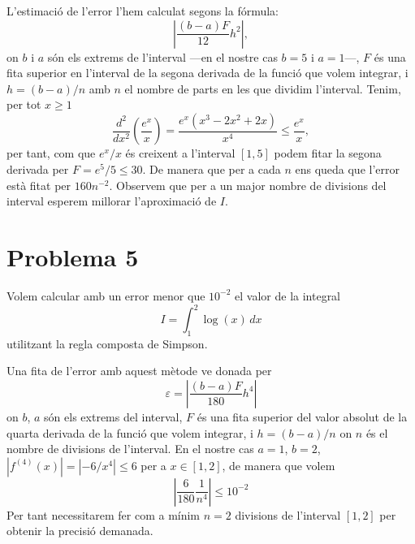 \documentclass[12pt]{article}
\numberwithin{table}{section}
\numberwithin{figure}{section}
\numberwithin{equation}{section}
\newcommand{\abs}[1]{\left\lvert #1 \right\rvert}
\begin{document}
L'estimació de l'error l'hem calculat segons la fórmula:
\begin{equation*}
	\abs{\dfrac{(b-a)F}{12}h^2},
\end{equation*}
on $b$ i $a$ són els extrems de l'interval ---en el nostre cas $b=5$ i $a=1$---, $F$ és una fita superior en l'interval de la segona derivada de la funció que volem integrar, i $h=(b-a)/n$ amb \( n \) el nombre de parts en les que dividim l'interval. Tenim, per tot \( x \geqslant 1 \) 
\begin{equation*}
	\frac{d^2}{dx^2}\left(\frac{e^x}{x}\right) = \dfrac{e^x(x^3-2x^2+2x)}{x^4} \leqslant \dfrac{e^x}{x},
\end{equation*}
per tant, com que \( e^{x}/x \) és creixent a l'interval \( [1,5] \) podem fitar la segona derivada per $F=e^5/5 \leqslant 30$. De manera que per a cada $n$ ens queda que l'error està fitat per \( 160  n^{-2} \). Observem que per a un major nombre de divisions del interval esperem millorar l'aproximació de $I$.

\newpage

\section{Problema 5}
Volem calcular amb un error menor que $10^{-2}$ el valor de la integral
\begin{equation*}
	I = \int_{1}^{2}\log(x) \, dx
\end{equation*}
utilitzant la regla composta de Simpson.

Una fita de l'error amb aquest mètode ve donada per
\begin{equation*}
	\varepsilon = \abs{\dfrac{(b-a)F}{180}h^4 } 
\end{equation*}
on $b$, $a$ són els extrems del interval, $F$ és una fita superior del valor absolut de la quarta derivada de la funció que volem integrar, i $h=(b-a)/n$ on $n$ és el nombre de divisions de l'interval. En el nostre cas $a=1$, $b=2$, $|f^{(4)}(x)|=|-6/x^4|\leqslant 6$ per a $x\in[1,2]$, de manera que volem
\begin{equation*}
	\abs{\frac{6}{180} \dfrac{1}{n^4}} \leqslant 10^{-2} 
\end{equation*}
Per tant necessitarem fer com a mínim $n=2$ divisions de l'interval $[1,2]$ per obtenir la precisió demanada.
\end{document}
